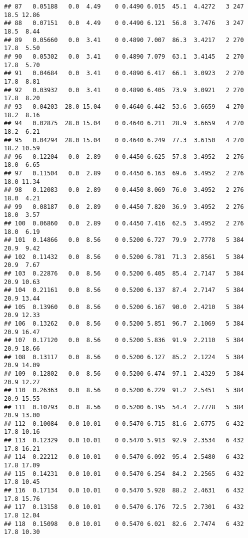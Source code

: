 \documentclass[
]{article}
\begin{document}
\begin{verbatim}
## 87   0.05188   0.0  4.49    0 0.4490 6.015  45.1  4.4272   3 247    18.5 12.86
## 88   0.07151   0.0  4.49    0 0.4490 6.121  56.8  3.7476   3 247    18.5  8.44
## 89   0.05660   0.0  3.41    0 0.4890 7.007  86.3  3.4217   2 270    17.8  5.50
## 90   0.05302   0.0  3.41    0 0.4890 7.079  63.1  3.4145   2 270    17.8  5.70
## 91   0.04684   0.0  3.41    0 0.4890 6.417  66.1  3.0923   2 270    17.8  8.81
## 92   0.03932   0.0  3.41    0 0.4890 6.405  73.9  3.0921   2 270    17.8  8.20
## 93   0.04203  28.0 15.04    0 0.4640 6.442  53.6  3.6659   4 270    18.2  8.16
## 94   0.02875  28.0 15.04    0 0.4640 6.211  28.9  3.6659   4 270    18.2  6.21
## 95   0.04294  28.0 15.04    0 0.4640 6.249  77.3  3.6150   4 270    18.2 10.59
## 96   0.12204   0.0  2.89    0 0.4450 6.625  57.8  3.4952   2 276    18.0  6.65
## 97   0.11504   0.0  2.89    0 0.4450 6.163  69.6  3.4952   2 276    18.0 11.34
## 98   0.12083   0.0  2.89    0 0.4450 8.069  76.0  3.4952   2 276    18.0  4.21
## 99   0.08187   0.0  2.89    0 0.4450 7.820  36.9  3.4952   2 276    18.0  3.57
## 100  0.06860   0.0  2.89    0 0.4450 7.416  62.5  3.4952   2 276    18.0  6.19
## 101  0.14866   0.0  8.56    0 0.5200 6.727  79.9  2.7778   5 384    20.9  9.42
## 102  0.11432   0.0  8.56    0 0.5200 6.781  71.3  2.8561   5 384    20.9  7.67
## 103  0.22876   0.0  8.56    0 0.5200 6.405  85.4  2.7147   5 384    20.9 10.63
## 104  0.21161   0.0  8.56    0 0.5200 6.137  87.4  2.7147   5 384    20.9 13.44
## 105  0.13960   0.0  8.56    0 0.5200 6.167  90.0  2.4210   5 384    20.9 12.33
## 106  0.13262   0.0  8.56    0 0.5200 5.851  96.7  2.1069   5 384    20.9 16.47
## 107  0.17120   0.0  8.56    0 0.5200 5.836  91.9  2.2110   5 384    20.9 18.66
## 108  0.13117   0.0  8.56    0 0.5200 6.127  85.2  2.1224   5 384    20.9 14.09
## 109  0.12802   0.0  8.56    0 0.5200 6.474  97.1  2.4329   5 384    20.9 12.27
## 110  0.26363   0.0  8.56    0 0.5200 6.229  91.2  2.5451   5 384    20.9 15.55
## 111  0.10793   0.0  8.56    0 0.5200 6.195  54.4  2.7778   5 384    20.9 13.00
## 112  0.10084   0.0 10.01    0 0.5470 6.715  81.6  2.6775   6 432    17.8 10.16
## 113  0.12329   0.0 10.01    0 0.5470 5.913  92.9  2.3534   6 432    17.8 16.21
## 114  0.22212   0.0 10.01    0 0.5470 6.092  95.4  2.5480   6 432    17.8 17.09
## 115  0.14231   0.0 10.01    0 0.5470 6.254  84.2  2.2565   6 432    17.8 10.45
## 116  0.17134   0.0 10.01    0 0.5470 5.928  88.2  2.4631   6 432    17.8 15.76
## 117  0.13158   0.0 10.01    0 0.5470 6.176  72.5  2.7301   6 432    17.8 12.04
## 118  0.15098   0.0 10.01    0 0.5470 6.021  82.6  2.7474   6 432    17.8 10.30

\end{verbatim}
\end{document}
